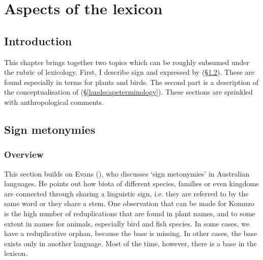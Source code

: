
\chapter{Aspects of the lexicon} \label{cha:lexicon}

\section{Introduction}

This chapter brings together two topics which can be roughly subsumed under the rubric of lexicology. First, I describe sign  and  expressed by  ({\S}\ref{redupmeton}). These are found especially in terms for plants and birds. The second part is a description of the conceptualisation of  ({\S}\ref{landscapeterminology}). These sections are sprinkled with anthropological comments.

\section{Sign metonymies}\label{redupmeton}

\subsection{Overview}

This section builds on Evans (\citeyear{Evans:1997vj}), who discusses `sign metonymies' in Australian languages. He points out how biota of different species, families or even kingdoms are connected through sharing a linguistic sign, i.e. they are referred to by the same word or they share a stem. One observation that can be made for Komnzo is the high number of reduplications that are found in plant names, and to some extent in names for animals, especially bird and fish species. In some cases, we have a reduplicative orphan, because the base is missing. In other cases, the base exists only in another language. Most of the time, however, there is a base in the lexicon.

